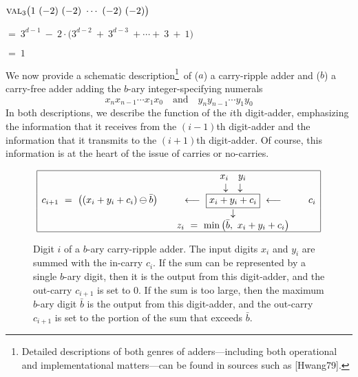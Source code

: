 \smallskip

$\displaystyle \mbox{\sc val}_3 \big( 1 \ (-2) \ (-2) \ \cdots \ (-2) \ (-2) \big)$

\smallskip

\hspace*{.25in}$= \ 3^{d-1} \ - \ 2 \cdot \big(3^{d-2} \ + \ 3^{d-3} \ + \cdots + \ 3 \ + \ 1 \big)$

\hspace*{.25in}$= \ 1$

\bigskip

We now provide a schematic description\footnote{Detailed descriptions of both genres of adders---including both operational and implementational matters---can be found in sources such as [Hwang79].}~of ($a$) a carry-ripple adder and ($b$) a carry-free adder adding the $b$-ary integer-specifying numerals
\[ x_n x_{n-1} \cdots x_1 x_0 \ \ \ \mbox{ and } \ \ \ 
y_n y_{n-1} \cdots y_1 y_0
\]
In both descriptions, we describe the function of the $i$th digit-adder, emphasizing the information that it receives from the $(i-1)$th digit-adder and the information that it transmits to the $(i+1)$th digit-adder.  Of course, this information is at the heart of the issue of carries or no-carries.

\begin{figure}[hbt]
\[
\begin{array}{|lcccr|}
\hline
 & & x_i \ \ \ y_i & & \\
 & & \downarrow \ \ \ \downarrow & & \\
c_{i+1} \ = \ \big( (x_i + y_i + c_i) \ominus \bar{b} \big)
 & & \longleftarrow \ \fbox{$x_i + y_i + c_i$} \ \longleftarrow & &  c_i 
  \\
 & & \downarrow & &
  \\
 & & z_i \ = \ \min \big( \bar{b}, \ x_i + y_i + c_i \big)  & & 
  \\
\hline
\end{array}
\]
\caption{Digit $i$ of a $b$-ary carry-ripple adder.  The input digits $x_i$ and $y_i$ are summed with the in-carry $c_i$.  If the sum can be represented by a single $b$-ary digit, then it is the output from this digit-adder, and the out-carry $c_{i+1}$ is set to $0$.  If the sum is too large, then the maximum $b$-ary digit $\bar{b}$ is the output from this digit-adder, and the out-carry $c_{i+1}$ is set to the portion of the sum that exceeds $\bar{b}$.}
\label{fig:carry-ripple-digit}
\end{figure}

\bigskip

